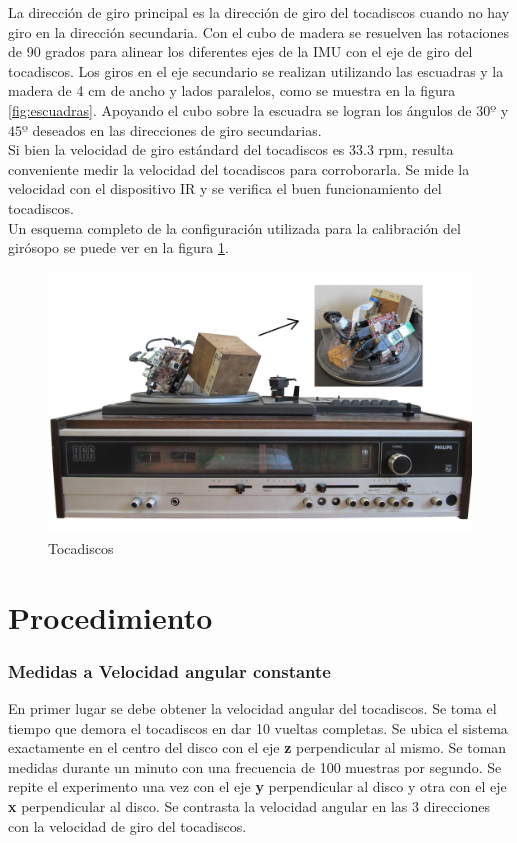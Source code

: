 \documentclass[spanish,12pt,a4paper,titlepage]{report}
\begin{document}
La dirección de giro principal es la dirección de giro del tocadiscos cuando no hay giro en la dirección secundaria. Con el cubo de madera se resuelven las rotaciones de 90 grados para alinear los diferentes ejes de la IMU con el eje de giro del tocadiscos. Los giros en el eje secundario se realizan utilizando las escuadras y la madera de 4 cm de ancho y lados paralelos, como se muestra en la figura \ref{fig:escuadras}. Apoyando el cubo sobre la escuadra se logran los ángulos de $30º$ y $45º$ deseados en las direcciones de giro secundarias.\\

Si bien la velocidad de giro estándard del tocadiscos es 33.3 rpm, resulta conveniente medir la velocidad del tocadiscos para corroborarla. Se mide la velocidad con el dispositivo IR y se verifica el buen funcionamiento del tocadiscos.\\

Un esquema completo de la configuración utilizada para la calibración del girósopo se puede ver en la figura \ref{fig:tocadiscos}.

\begin{figure}[h!]
	\centering
	\includegraphics[width=.9\textwidth]{./pics/tocadiscos.jpg}
	\caption{Tocadiscos}
	\label{fig:tocadiscos}
\end{figure}


\section{Procedimiento}



\subsubsection*{Medidas a Velocidad angular constante}
En primer lugar se debe obtener la velocidad angular del tocadiscos. Se toma el tiempo que demora el tocadiscos en dar 10 vueltas completas. Se ubica el sistema exactamente en el centro del disco con el eje \textbf{z} perpendicular al mismo. Se toman medidas durante un minuto con una frecuencia de 100 muestras por segundo. Se repite el experimento una vez con el eje \textbf{y} perpendicular al disco y otra con el eje \textbf{x} perpendicular al disco. Se contrasta la velocidad angular en las 3 direcciones con la velocidad de giro del tocadiscos.
\end{document}
